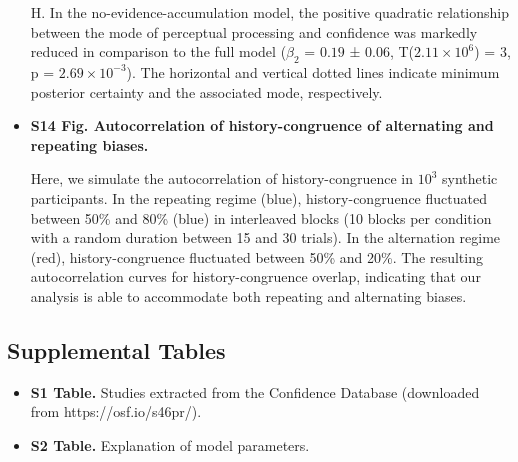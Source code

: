 \documentclass[
]{article}
\begin{document}
\begin{itemize}
H. In the no-evidence-accumulation model, the positive quadratic
relationship between the mode of perceptual processing and confidence
was markedly reduced in comparison to the full model (\(\beta_2\) =
\(0.19\) ± \(0.06\), T(\(\ensuremath{2.11\times 10^{6}}\)) = \(3\), p =
\(\ensuremath{2.69\times 10^{-3}}\)). The horizontal and vertical dotted
lines indicate minimum posterior certainty and the associated mode,
respectively.

\item \textbf{S14 Fig. Autocorrelation of history-congruence of alternating and repeating biases.}

Here, we simulate the autocorrelation of history-congruence in \(\ensuremath{10^{3}}\)
synthetic participants. In the repeating regime (blue),
history-congruence fluctuated between 50\% and 80\% (blue) in
interleaved blocks (10 blocks per condition with a random duration
between 15 and 30 trials). In the alternation regime (red),
history-congruence fluctuated between 50\% and 20\%. The resulting
autocorrelation curves for history-congruence overlap, indicating that
our analysis is able to accommodate both repeating and alternating
biases.

\end{itemize}

\subsection*{{Supplemental Tables}\label{Supplemental Tables}}
\begin{itemize}
\item \textbf{S1 Table.} Studies extracted from the Confidence Database (downloaded from https://osf.io/s46pr/).
\item \textbf{S2 Table.} Explanation of model parameters.
\end{itemize}
 
\end{document}
